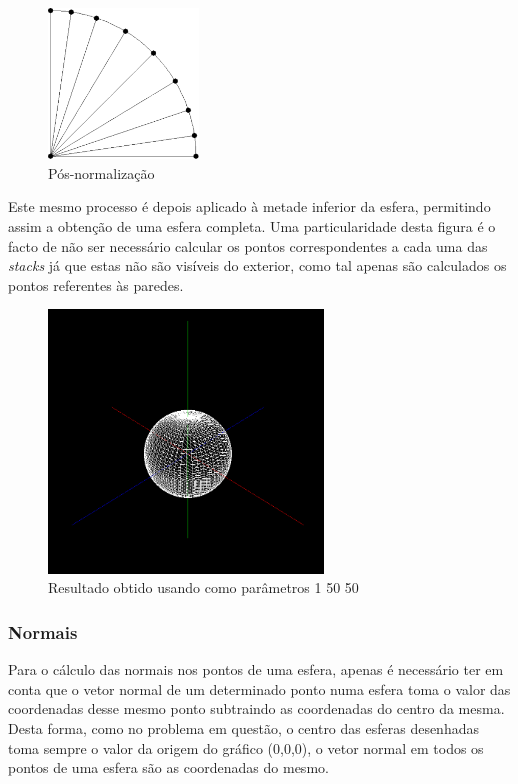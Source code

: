 \documentclass{article}
\begin{document}
\begin{figure}[H]
    \centering
    \includegraphics[height=4cm]{afterNorm.png}
    \caption{Pós-normalização}
\end{figure}

Este mesmo processo é depois aplicado à metade inferior da esfera, permitindo assim a obtenção de uma esfera completa. Uma particularidade desta figura é o facto de não ser necessário calcular os pontos correspondentes a cada uma das \textit{stacks} já que estas não são visíveis do exterior, como tal apenas são calculados os pontos referentes às paredes.

\begin{figure}[H]
    \centering
    \includegraphics[height=7cm]{sphereFinal.png}
    \caption{Resultado obtido usando como parâmetros 1 50 50}
\end{figure}

\subsubsection{Normais}
Para o cálculo das normais nos pontos de uma esfera, apenas é necessário ter em conta que o vetor normal de um determinado ponto numa esfera toma o valor das coordenadas desse mesmo ponto subtraindo as coordenadas do centro da mesma.\\
Desta forma, como no problema em questão, o centro das esferas desenhadas toma sempre o valor da origem do gráfico (0,0,0), o vetor normal em todos os pontos de uma esfera são as coordenadas do mesmo.
\end{document}
